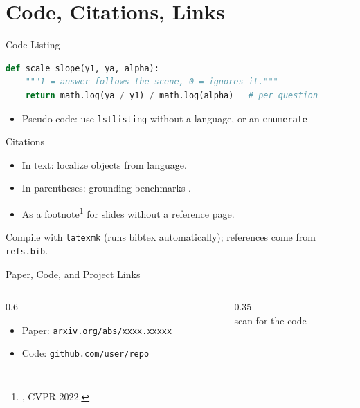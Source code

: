 \documentclass[aspectratio=169,10pt]{beamer}
\begin{document}
\section{Code, Citations, Links}

\begin{frame}[fragile]{Code Listing}
\begin{lstlisting}[language=Python]
def scale_slope(y1, ya, alpha):
    """1 = answer follows the scene, 0 = ignores it."""
    return math.log(ya / y1) / math.log(alpha)   # per question
\end{lstlisting}
  \begin{itemize}
    \item Pseudo-code: use \texttt{lstlisting} without a language, or an \texttt{enumerate}
  \end{itemize}
\end{frame}

\begin{frame}{Citations}
  \begin{itemize}
    \item In text: \citet{chen2020scanrefer} localize objects from language.
    \item In parentheses: grounding benchmarks \citep{chen2020scanrefer, azuma2022scanqa}.
    \item As a footnote\footnote{\citet{azuma2022scanqa}, CVPR 2022.} for slides without a reference page.
  \end{itemize}
  {\scriptsize Compile with \texttt{latexmk} (runs bibtex automatically); references come from \texttt{refs.bib}.}
\end{frame}

\begin{frame}{Paper, Code, and Project Links}
  \begin{columns}[c]
    \begin{column}{0.6\textwidth}
      \begin{itemize}
        \item Paper: \href{https://arxiv.org/}{\texttt{arxiv.org/abs/xxxx.xxxxx}}
        \item Code: \href{https://github.com/}{\texttt{github.com/user/repo}}
      \end{itemize}
    \end{column}
    \begin{column}{0.35\textwidth}
      \centering
      \\[3pt]
      {\scriptsize scan for the code}
    \end{column}
  \end{columns}
\end{frame}
\end{document}
